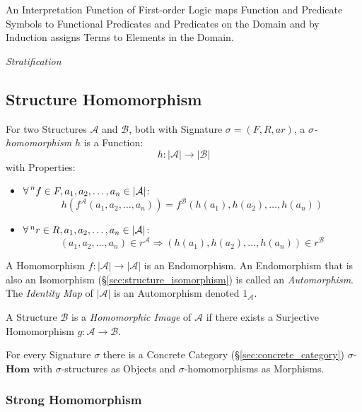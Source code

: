 An Interpretation Function of First-order Logic maps Function and
Predicate Symbols to Functional Predicates and Predicates on the
Domain and by Induction assigns Terms to Elements in the Domain.

\emph{Stratification}



\subsection{Structure Homomorphism}\label{sec:structure_homomorphism}

For two Structures $\mathcal{A}$ and $\mathcal{B}$, both with
Signature $\sigma = (F,R,ar)$, a \emph{$\sigma$-homomorphism} $h$ is a
Function:
\[
  h : |\mathcal{A}| \rightarrow |\mathcal{B}|
\]
with Properties:
\begin{itemize}
  \item $\forall \prescript{n}{}{f} \in F,
    a_1, a_2,\ldots, a_n \in |\mathcal{A}|$:
    \[
      h (f^\mathcal{A}(a_1, a_2,\ldots, a_n))
      = f^\mathcal{B} (h(a_1), h(a_2),\ldots, h(a_n))
    \]
  \item $\forall \prescript{n}{}{r} \in R,
    a_1, a_2,\ldots, a_n \in |\mathcal{A}|$:
    \[
      (a_1,a_2,\ldots,a_n) \in r^\mathcal{A} \Rightarrow
      (h(a_1), h(a_2),\ldots,h(a_n)) \in r^\mathcal{B}
    \]
\end{itemize}
A Homomorphism $f : |\mathcal{A}| \rightarrow |\mathcal{A}|$ is an
Endomorphism. An Endomorphism that is also an Isomorphism
(\S\ref{sec:structure_isomorphism}) is called an \emph{Automorphism}.
The \emph{Identity Map} of $|\mathcal{A}|$ is an Automorphism denoted
$1_\mathcal{A}$.

A Structure $\mathcal{B}$ is a \emph{Homomorphic Image} of
$\mathcal{A}$ if there exists a Surjective Homomorphism $g :
\mathcal{A} \rightarrow \mathcal{B}$.

For every Signature $\sigma$ there is a Concrete Category
(\S\ref{sec:concrete_category}) $\sigma$-$\mathbf{Hom}$ with
$\sigma$-structures as Objects and $\sigma$-homomorphisms as
Morphisms.



\subsubsection{Strong Homomorphism}\label{sec:strong_homomorphism}

